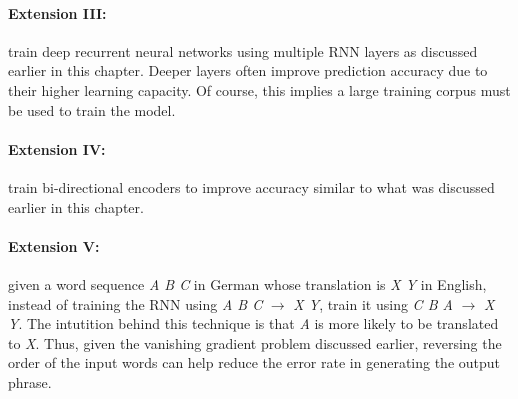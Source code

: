 \documentclass{tufte-handout}
\begin{document}
\paragraph{Extension III:} train deep recurrent neural networks using multiple RNN layers as discussed earlier in this chapter. Deeper layers often improve prediction accuracy due to their higher learning capacity. Of course, this implies a large training corpus must be used to train the model.

\paragraph{Extension IV:} train bi-directional encoders to improve accuracy similar to what was discussed earlier in this chapter.

\paragraph{Extension V:} given a word sequence  \textit{A B C} in German whose translation is \textit{X Y} in English, instead of training the RNN using \textit{A B C} $\to$ \textit{X Y}, train it using \textit{C B A} $\to$ \textit{X Y}. The intutition behind this technique is that \textit{A} is more likely to be translated to \textit{X}. Thus, given the vanishing gradient problem discussed earlier, reversing the order of the input words can help reduce the error rate in generating the output phrase.
\end{document}
